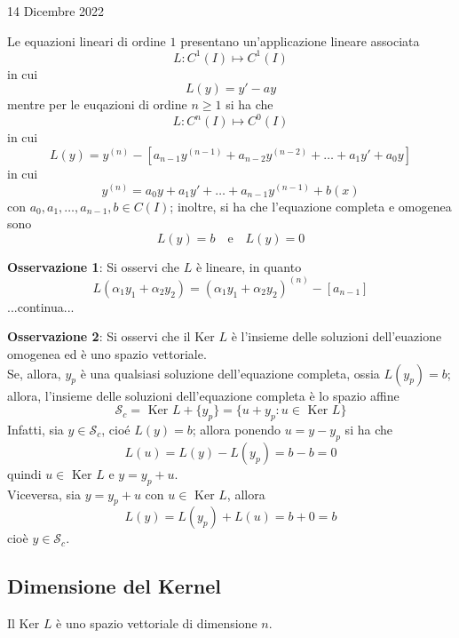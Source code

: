 \documentclass[a4paper]{extarticle}
\begin{document}
\newpage
\noindent
\begin{center}
    14 Dicembre 2022
\end{center}
Le equazioni lineari di ordine $1$ presentano un'applicazione lineare associata
\[L : C^1(I) \longmapsto C^1(I)\]
in cui
\[L(y) = y'-ay\]
mentre per le euqazioni di ordine $n \geq 1$ si ha che
\[L : C^n(I) \longmapsto C^0(I)\]
in cui
\[L(y) = y^{(n)} - \left[a_{n-1} y^{(n-1)} + a_{n-2} y^{(n-2)} + \dots + a_1 y' + a_0 y\right]\]
in cui
\[y^{(n)} = a_0 y + a_1 y' + \dots + a_{n-1} y^{(n-1)} + b(x)\]
con $a_0,a_1,\dots,a_{n-1}, b \in C(I)$; inoltre, si ha che l'equazione completa e omogenea sono
\[L(y) = b \hspace{1em} \text{e} \hspace{1em} L(y)=0\]

\vspace{2em}
\noindent
\textbf{Osservazione 1}: Si osservi che $L$ è lineare, in quanto
\[L(\alpha_1 y_1 + \alpha_2 y_2) = (\alpha_1 y_1 + \alpha_2 y_2)^{(n)} - \left[a_{n-1} \right]\]
...continua...

\vspace{2em}
\noindent
\textbf{Osservazione 2}: Si osservi che il Ker $L$ è l'insieme delle soluzioni dell'euazione omogenea ed è uno spazio vettoriale.\\
Se, allora, $y_p$ è una qualsiasi soluzione dell'equazione completa, ossia $L(y_p)=b$; allora, l'insieme delle soluzioni dell'equazione completa è lo spazio affine
\[\mathcal{S}_c = \text{ Ker } L + \{y_p\} = \{u + y_p : u \in \text{ Ker } L\}\]
Infatti, sia $y \in \mathcal{S}_c$, cioé $L(y)=b$; allora ponendo $u=y-y_p$ si ha che
\[L(u) = L(y) - L(y_p) = b-b = 0\]
quindi $u \in \text{ Ker } L$ e $y=y_p+u$.\\
Viceversa, sia $y=y_p+u$ con $u \in \text{ Ker } L$, allora
\[L(y) = L(y_p) + L(u) = b + 0 = b\]
cioè $y \in \mathcal{S}_c$.

\vspace{1em}
\subsection{Dimensione del Kernel}
Il Ker $L$ è uno spazio vettoriale di dimensione $n$.
\end{document}
